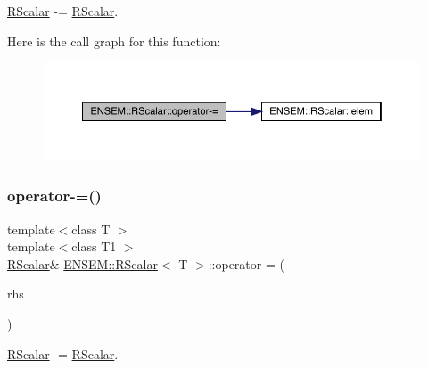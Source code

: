 \mbox{\hyperlink{classENSEM_1_1RScalar}{R\+Scalar}} -\/= \mbox{\hyperlink{classENSEM_1_1RScalar}{R\+Scalar}}. 

Here is the call graph for this function\+:
\nopagebreak
\begin{figure}[H]
\begin{center}
\leavevmode
\includegraphics[width=350pt]{d0/d8c/classENSEM_1_1RScalar_a6d158db5ecf3dcc81fe905c6664cac58_cgraph}
\end{center}
\end{figure}
\mbox{\label{classENSEM_1_1RScalar_a6d158db5ecf3dcc81fe905c6664cac58}} 
\subsubsection{\texorpdfstring{operator-\/=()}{operator-=()}\hspace{0.1cm}{\footnotesize\ttfamily [2/3]}}
{\footnotesize\ttfamily template$<$class T $>$ \\
template$<$class T1 $>$ \\
\mbox{\hyperlink{classENSEM_1_1RScalar}{R\+Scalar}}\& \mbox{\hyperlink{classENSEM_1_1RScalar}{E\+N\+S\+E\+M\+::\+R\+Scalar}}$<$ T $>$\+::operator-\/= (\begin{DoxyParamCaption}\item[{const \mbox{\hyperlink{classENSEM_1_1RScalar}{R\+Scalar}}$<$ T1 $>$ \&}]{rhs }\end{DoxyParamCaption})\hspace{0.3cm}{\ttfamily [inline]}}



\mbox{\hyperlink{classENSEM_1_1RScalar}{R\+Scalar}} -\/= \mbox{\hyperlink{classENSEM_1_1RScalar}{R\+Scalar}}. 

